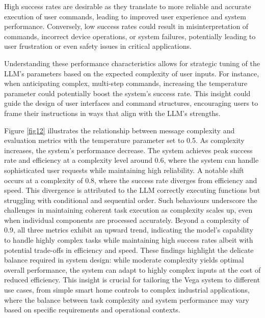 \documentclass[lettersize,journal]{IEEEtran}
\begin{document}
High success rates are desirable as they translate to more reliable and accurate execution of user commands, leading to improved user experience and system performance. Conversely, low success rates could result in misinterpretation of commands, incorrect device operations, or system failures, potentially leading to user frustration or even safety issues in critical applications. 

Understanding these performance characteristics allows for strategic tuning of the LLM's parameters based on the expected complexity of user inputs. For instance, when anticipating complex, multi-step commands, increasing the temperature parameter could potentially boost the system's success rate. This insight could guide the design of user interfaces and command structures, encouraging users to frame their instructions in ways that align with the LLM's strengths.


Figure \ref{fig12} illustrates the relationship between message complexity and evaluation metrics with the temperature parameter set to 0.5. As complexity increases, the system's performance decrease. The system achieves peak success rate and efficiency at a complexity level around 0.6, where the system can handle sophisticated user requests while maintaining high reliability. A notable shift occurs at a complexity of 0.8, where the success rate diverges from efficiency and speed. This divergence is attributed to the LLM correctly executing functions but struggling with conditional and sequential order. Such behaviours underscore the challenges in maintaining coherent task execution as complexity scales up, even when individual components are processed accurately. Beyond a complexity of 0.9, all three metrics exhibit an upward trend, indicating the model's capability to handle highly complex tasks while maintaining high success rates albeit with potential trade-offs in efficiency and speed. These findings highlight the delicate balance required in system design: while moderate complexity yields optimal overall performance, the system can adapt to highly complex inputs at the cost of reduced efficiency. This insight is crucial for tailoring the Vega system to different use cases, from simple smart home controls to complex industrial applications, where the balance between task complexity and system performance may vary based on specific requirements and operational contexts. 
\end{document}
